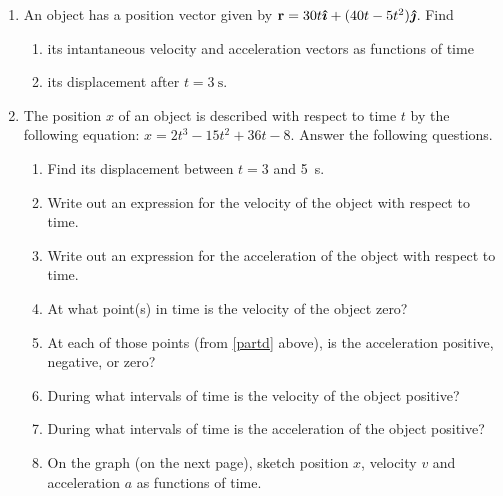 \documentclass{../../../oss-classkick}
\begin{document}
\begin{enumerate}[leftmargin=15pt]
\item An object has a position vector given by
  $\mathbf{r}=30t\bm{\hat{\imath}}+(40t-5t^2)\bm{\hat{\jmath}}$. Find
  \begin{enumerate}[noitemsep,topsep=0pt]
  \item its intantaneous velocity and acceleration vectors as functions of time
  \item its displacement after $t=\SI{3}{\second}$.
  \end{enumerate}
  \vspace{3in}

\item The position $x$ of an object is described with respect to time $t$ by
  the following equation: $x=2t^3-15t^2+36t-8$. Answer the following questions.
  \begin{enumerate}[noitemsep,topsep=0pt]
  \item Find its displacement between $t=\num{3}$ and \SI{5}{\second}.
  \item Write out an expression for the velocity of the object with respect to
    time.
  \item Write out an expression for the acceleration of the object with respect
    to time.
  \item At what point(s) in time is the velocity of the object zero?
    \label{partd}
  \item At each of those points (from \ref{partd} above), is the acceleration
    positive, negative, or zero?
  \item During what intervals of time is the velocity of the object positive?
  \item During what intervals of time is the acceleration of the object
    positive?
  \item On the graph (on the next page), sketch position $x$, velocity $v$ and
    acceleration $a$ as functions of time.
  \end{enumerate}
  \vspace{\stretch1}
  \begin{center}


\end{center}
\end{enumerate}
\end{document}
